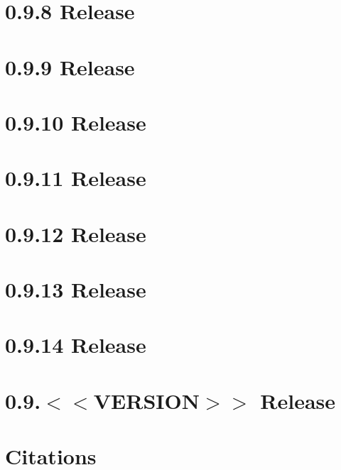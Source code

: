 \let\mypdfximage\pdfximage\def\pdfximage{\immediate\mypdfximage}\documentclass[twoside]{book}
\newcommand{\+}{\discretionary{\mbox{\scriptsize$\hookleftarrow$}}{}{}}
\begin{document}
\chapter{0.9.8 Release}
\label{doc_news_2021-10-04_0_9_8_md}

\chapter{0.9.9 Release}
\label{doc_news_2022-03-10_0_9_9_md}

\chapter{0.9.10 Release}
\label{doc_news_2022-07-11_0_9_10_md}

\chapter{0.9.11 Release}
\label{doc_news_2022-10-05_0_9_11_md}

\chapter{0.9.12 Release}
\label{doc_news_2023-03-03_0_9_12_md}

\chapter{0.9.13 Release}
\label{doc_news_2023-03-14_0_9_13_md}

\chapter{0.9.14 Release}
\label{doc_news_2023-03-16_0_9_14_md}

\chapter{0.9.$<$$<$VERSION$>$$>$ Release}
\label{doc_news__preparation_next_release_md}

\chapter{Citations}
\label{doc_paper_README_md}

\end{document}
